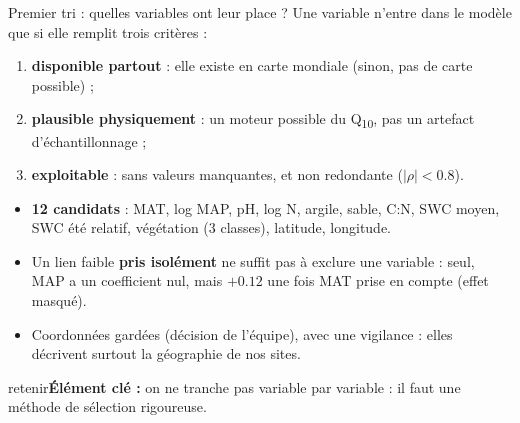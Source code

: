 \documentclass[aspectratio=169,10pt]{beamer}
\newcommand{\retenir}[1]{\vfill\begin{beamercolorbox}[sep=5pt,rounded=true]{retenir}\small\textbf{Élément clé :} #1\end{beamercolorbox}}
\newcommand{\Qdix}{Q\textsubscript{10}}
\newcommand{\CN}{{\NoAutoSpacing C:N}}
\begin{document}
\begin{frame}{Premier tri : quelles variables ont leur place ?}
  \small
  Une variable n'entre dans le modèle que si elle remplit trois critères :
  \begin{enumerate}
    \item \textbf{disponible partout} : elle existe en carte mondiale (sinon, pas de carte possible) ;
    \item \textbf{plausible physiquement} : un moteur possible du \Qdix{}, pas un artefact d'échantillonnage ;
    \item \textbf{exploitable} : sans valeurs manquantes, et non redondante ($|\rho| < 0.8$).
  \end{enumerate}
  \vspace{0.2cm}
  \begin{itemize}
    \item \textbf{12 candidats} : MAT, log MAP, pH, log N, argile, sable, \CN{}, SWC moyen, SWC été relatif, végétation (3 classes), latitude, longitude.
    \item Un lien faible \textbf{pris isolément} ne suffit pas à exclure une variable : seul, MAP a un coefficient nul, mais $+0.12$ une fois MAT prise en compte (effet masqué).
    \item Coordonnées gardées (décision de l'équipe), avec une vigilance : elles décrivent surtout la géographie de nos sites.
  \end{itemize}
  \retenir{on ne tranche pas variable par variable : il faut une méthode de sélection rigoureuse.}
\end{frame}
\end{document}
